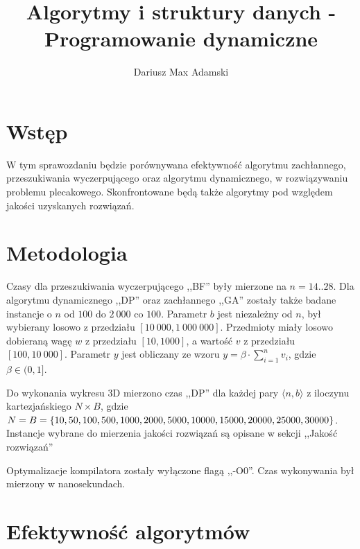 \documentclass[12pt,twocolumn]{article}
\title{Algorytmy i struktury danych - Programowanie dynamiczne}
\author{Dariusz Max Adamski}
\date{}
\begin{document}
\maketitle


\section*{Wstęp}

W tym sprawozdaniu będzie porównywana efektywność algorytmu zachłannego,
przeszukiwania wyczerpującego oraz algorytmu dynamicznego,
w rozwiązywaniu problemu plecakowego.
Skonfrontowane będą także algorytmy pod względem jakości uzyskanych rozwiązań.


\section{Metodologia}

Czasy dla przeszukiwania wyczerpującego ,,BF'' były mierzone na $n = 14..28$.
Dla algorytmu dynamicznego ,,DP'' oraz zachłannego ,,GA'' zostały także badane instancje o 
$n$ od $100$ do $2\ 000$ co $100$.
Parametr $b$ jest niezależny od $n$, był wybierany losowo z przedziału $[10\ 000, 1\ 000\ 000]$.
Przedmioty miały losowo dobieraną wagę $w$ z przedziału $[10, 1000]$, a wartość $v$ z przedziału $[100, 10\ 000]$.
Parametr $y$ jest obliczany ze wzoru $y = \beta \cdot \sum_{i=1}^n v_i$, gdzie $\beta \in (0, 1]$.

Do wykonania wykresu 3D mierzono czas ,,DP'' dla każdej pary $\langle n, b \rangle$ z iloczynu kartezjańskiego $N \times B$, gdzie
$N = B = \{10, 50, 100, 500, 1000, 2000, 5000, 10000, \\ 15000, 20000, 25000, 30000\}$.
Instancje wybrane do mierzenia jakości rozwiązań są opisane w sekcji ,,Jakość rozwiązań''

Optymalizacje kompilatora zostały wyłączone flagą ,,-O0''. 
Czas wykonywania był mierzony w nanosekundach.

\section{Efektywność algorytmów}
\end{document}
